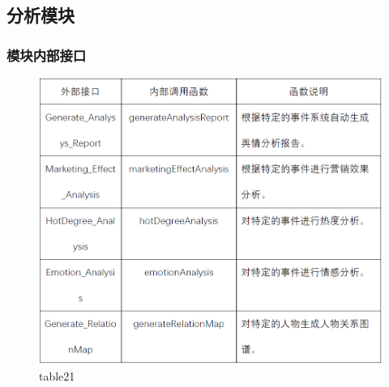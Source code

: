 \subsection{分析模块}
\subsubsection{模块内部接口}
\begin{figure}[!htb]
	\centering
	\includegraphics[scale=1]{image/b21.png} %
	\caption{table21} %
\end{figure}
